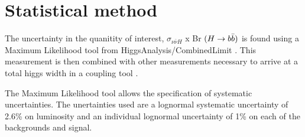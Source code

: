 \documentclass[preprintnumbers,nofootinbib,noshowpacs,eqsecnum,prd,superscriptaddress,letterpaper]{revtex4}
\begin{document}


\section{Statistical method}
\label{sec:method}

The uncertainty in the quanitity of interest, $\sigma_{\nu\bar{\nu}H}$ x Br $(H \rightarrow b\bar{b})$ is found using a Maximum Likelihood tool from HiggsAnalysis/CombinedLimit \cite{higgsanalysis}. This measurement is then combined with other measurements necessary to arrive at a total higgs width in a coupling tool \cite{couplingtool}.

The Maximum Likelihood tool allows the specification of systematic uncertainties. The unertainties used are a lognormal systematic uncertainty of 2.6\% on luminosity and an individual lognormal uncertainty of 1\% on each of the backgrounds and signal.
\end{document}
